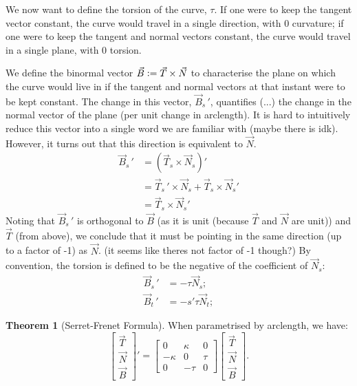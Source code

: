 \documentclass{article}
\theoremstyle{definition}
\newtheorem{thm}{Theorem}[subsubsection]
\begin{document}
We now want to define the torsion of the curve, $\tau$. If one were to keep the tangent vector constant, the curve would travel in a single direction, with 0 curvature; if one were to keep the tangent and normal vectors constant, the curve would travel in a single plane, with 0 torsion.\par

We define the binormal vector $\vec B\vcentcolon=\vec T\times\vec N$ to characterise the plane on which the curve would live in if the tangent and normal vectors at that instant were to be kept constant. The change in this vector, $\vec B_s\,'$, quantifies (...) the change in the normal vector of the plane (per unit change in arclength). It is hard to intuitively reduce this vector into a single word we are familiar with (maybe there is idk). However, it turns out that this direction is equivalent to $\vec N$.
\begin{align*}
	\vec B_s\,'&=(\vec T_s\times\vec N_s)'\\
	&=\vec T_s\,'\times\vec N_s+\vec T_s\times\vec N_s'\\
	&=\vec T_s\times\vec N_s'
\end{align*}
Noting that $\vec B_s\,'$ is orthogonal to $\vec B$ (as it is unit (because $\vec T$ and $\vec N$ are unit)) and $\vec T$ (from above), we conclude that it must be pointing in the same direction (up to a factor of -1) as $\vec N$. (it seems like theres not factor of -1 though?) By convention, the torsion is defined to be the negative of the coefficient of $\vec N_s$:
\begin{align*}
	\vec B_s\,'&=-\tau\vec N_s;\\
	\vec B_t\,'&=-s'\tau\vec N_t;
\end{align*}
\begin{thm}[Serret-Frenet Formula]
	When parametrised by arclength, we have:
	\[\begin{bmatrix}\vec T\\\vec N\\\vec B\end{bmatrix}'=\begin{bmatrix}0&\kappa&0\\-\kappa&0&\tau\\0&-\tau&0\end{bmatrix}\begin{bmatrix}\vec T\\\vec N\\\vec B\end{bmatrix}.\]
\end{thm}
\end{document}
